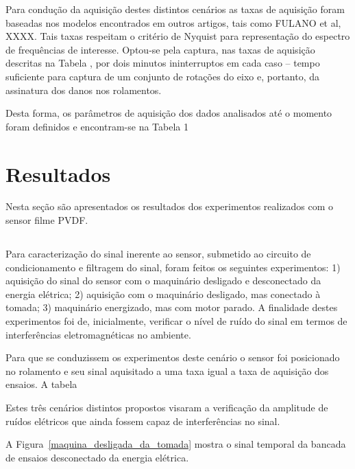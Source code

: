 \documentclass[
	12pt,				
	oneside,			
	a4paper,			
	english,			
	brazil,			
	]{abntex2ppgsi}
\begin{document}
Para condução da aquisição destes distintos cenários as taxas de aquisição foram baseadas nos modelos encontrados em outros artigos, tais como FULANO et al, XXXX. Tais taxas respeitam o critério de Nyquist para representação do espectro de frequências de interesse. Optou-se pela captura, nas taxas de aquisição descritas na Tabela , por dois minutos ininterruptos em cada caso – tempo suficiente para captura de um conjunto de rotações do eixo e, portanto, da assinatura dos danos nos rolamentos. 

Desta forma, os parâmetros de aquisição dos dados analisados até o momento foram definidos e encontram-se na Tabela 1

\chapter{Resultados}

Nesta seção são apresentados os resultados dos experimentos realizados com o sensor filme PVDF.

\section{}

Para caracterização do sinal inerente ao sensor, submetido ao circuito de condicionamento e filtragem do sinal, foram feitos os seguintes experimentos: 1) aquisição do sinal do sensor com o maquinário desligado e desconectado da energia elétrica; 2) aquisição com o maquinário desligado, mas conectado à tomada; 3) maquinário energizado, mas com motor parado. A finalidade destes experimentos foi de, inicialmente, verificar o nível de ruído do sinal em termos de interferências eletromagnéticas no ambiente.

Para que se conduzissem os experimentos deste cenário o sensor foi posicionado no rolamento e seu sinal aquisitado a uma taxa igual a taxa de aquisição dos ensaios. A tabela 

Estes três cenários distintos propostos visaram a verificação da amplitude de ruídos elétricos que ainda fossem capaz de interferências no sinal. 

A Figura~\ref{maquina_desligada_da_tomada} mostra o sinal temporal da bancada de ensaios desconectado da energia elétrica. 
\end{document}
